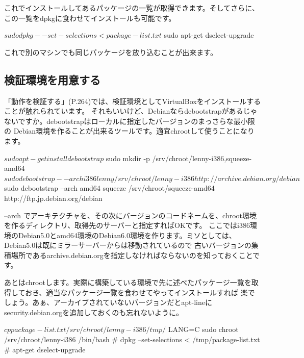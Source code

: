 \documentclass[mingoth,a4paper]{jsarticle}
\begin{document}

これでインストールしてあるパッケージの一覧が取得できます。そしてさらに、この一覧をdpkgに食わせてインストールも可能です。

\begin{commandline}
$ sudo dpkg --set-selections < package-list.txt
$ sudo apt-get dselect-upgrade
\end{commandline}

これで別のマシンでも同じパッケージを放り込むことが出来ます。

\subsection{検証環境を用意する}

「動作を検証する」(P.264)では、検証環境としてVirtualBoxをインストールすることが触れられています。
それもいいけど、Debianならdebootstrapがあるじゃないですか。debootstrapはローカルに指定したバージョンのまっさらな最小限の
Debian環境を作ることが出来るツールです。適宜chrootして使うことになります。

\begin{commandline}
$ sudo apt-get install debootstrap
$ sudo mkdir -p /srv/chroot/{lenny-i386,squeeze-amd64}
$ sudo debootstrap --arch i386 lenny /srv/chroot/lenny-i386 http://archive.debian.org/debian
$ sudo debootstrap --arch amd64 squeeze /srv/chroot/squeeze-amd64 http://ftp.jp.debian.org/debian
\end{commandline}

--arch でアーキテクチャを、その次にバージョンのコードネームを、chroot環境を作るディレクトリ、取得先のサーバーと指定すればOKです。
ここではi386環境のDebian5.0とamd64環境のDebian6.0環境を作ります。ミソとしては、Debian5.0は既にミラーサーバーからは移動されているので
古いバージョンの集積場所であるarchive.debian.orgを指定しなければならないのを知っておくことです。

あとはchrootします。実際に構築している環境で先に述べたパッケージ一覧を取得しておき、適当なパッケージ一覧を食わせてやってインストールすれば
楽でしょう。あぁ、アーカイブされていないバージョンだとapt-lineにsecurity.debian.orgを追加しておくのも忘れないように。

\begin{commandline}
$ cp package-list.txt /srv/chroot/lenny-i386/tmp/
$ LANG=C sudo chroot /srv/chroot/lenny-i386 /bin/bash
# dpkg --set-selections < /tmp/package-list.txt
# apt-get dselect-upgrade
\end{commandline}
\end{document}
